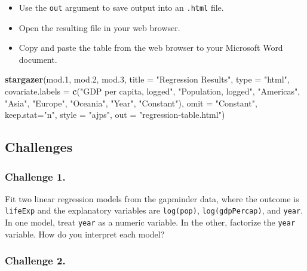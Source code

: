 \documentclass[]{book}
\newenvironment{Shaded}{\begin{snugshade}}{\end{snugshade}}
\newcommand{\KeywordTok}[1]{\textcolor[rgb]{0.13,0.29,0.53}{\textbf{#1}}}
\newcommand{\DataTypeTok}[1]{\textcolor[rgb]{0.13,0.29,0.53}{#1}}
\newcommand{\DecValTok}[1]{\textcolor[rgb]{0.00,0.00,0.81}{#1}}
\newcommand{\StringTok}[1]{\textcolor[rgb]{0.31,0.60,0.02}{#1}}
\newcommand{\NormalTok}[1]{#1}
\providecommand{\tightlist}{%
  \setlength{\itemsep}{0pt}\setlength{\parskip}{0pt}}
\begin{document}
\begin{itemize}
\tightlist
\item
  Use the \texttt{out} argument to save output into an \texttt{.html}
  file.
\item
  Open the resulting file in your web browser.
\item
  Copy and paste the table from the web browser to your Microsoft Word
  document.
\end{itemize}

\begin{Shaded}
\begin{Highlighting}[]
\KeywordTok{stargazer}\NormalTok{(mod.}\DecValTok{1}\NormalTok{, mod.}\DecValTok{2}\NormalTok{, mod.}\DecValTok{3}\NormalTok{, }\DataTypeTok{title =} \StringTok{"Regression Results"}\NormalTok{, }\DataTypeTok{type =} \StringTok{"html"}\NormalTok{, }
          \DataTypeTok{covariate.labels  =} \KeywordTok{c}\NormalTok{(}\StringTok{"GDP per capita, logged"}\NormalTok{, }\StringTok{"Population, logged"}\NormalTok{, }\StringTok{"Americas"}\NormalTok{, }\StringTok{"Asia"}\NormalTok{, }\StringTok{"Europe"}\NormalTok{, }\StringTok{"Oceania"}\NormalTok{, }\StringTok{"Year"}\NormalTok{, }\StringTok{"Constant"}\NormalTok{), }
          \DataTypeTok{omit =} \StringTok{"Constant"}\NormalTok{, }
          \DataTypeTok{keep.stat=}\StringTok{"n"}\NormalTok{, }\DataTypeTok{style =} \StringTok{"ajps"}\NormalTok{,}
          \DataTypeTok{out =} \StringTok{"regression-table.html"}\NormalTok{)}
\end{Highlighting}
\end{Shaded}

\subsection{Challenges}\label{challenges-14}

\subsubsection*{Challenge 1.}\label{challenge-1.-10}

Fit two linear regression models from the gapminder data, where the
outcome is \texttt{lifeExp} and the explanatory variables are
\texttt{log(pop)}, \texttt{log(gdpPercap)}, and \texttt{year}. In one
model, treat \texttt{year} as a numeric variable. In the other,
factorize the \texttt{year} variable. How do you interpret each model?

\subsubsection*{Challenge 2.}\label{challenge-2.-10}
\end{document}
